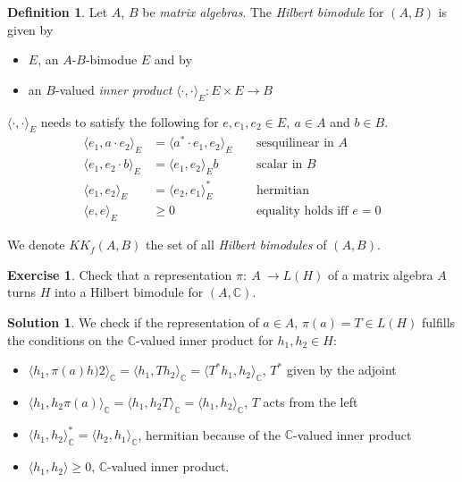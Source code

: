 \documentclass[a4paper]{article}
\theoremstyle{definition}
\newtheorem{definition}{Definition}
\theoremstyle{definition}
\theoremstyle{definition}
\theoremstyle{theorem}
\theoremstyle{theorem}
\newtheorem{exercise}{Exercise}
\theoremstyle{theorem}
\theoremstyle{definition}
\newtheorem{solution}{Solution}
\begin{document}
\begin{definition}
    Let $A$, $B$ be \textit{matrix algebras}. The \textit{Hilbert bimodule} for $(A, B)$ is given by
    \begin{itemize}
        \item $E$, an $A$-$B$-bimodue $E$ and by
        \item an $B$-valued \textit{inner product} $\langle \cdot,\cdot\rangle_E: E\times E \rightarrow B$
    \end{itemize}
$\langle \cdot,\cdot\rangle_E$ needs to satisfy the following for $e, e_1, e_2 \in E,\ a \in A$ and $b \in B$.
\begin{align*}
    \langle e_1, a\cdot e_2\rangle_E &= \langle a^*\cdot e_1, e_2\rangle_E \;\;\;\; & \text{sesquilinear in $A$}\\
    \langle e_1, e_2 \cdot b\rangle_E &= \langle e_1, e_2\rangle_E b \;\;\;\; & \text{scalar in $B$} \\
    \langle e_1, e_2\rangle_E &= \langle e_2,e_1\rangle^*_E \;\;\;\; & \text{hermitian} \\
    \langle e, e\rangle_E &\ge 0 \;\;\;\; & \text{equality holds iff $e=0$}
\end{align*}

\end{definition}

We denote $KK_f(A,B)$ the set of all \textit{Hilbert bimodules} of $(A,B)$.

\begin{exercise}
    Check that a representation $\pi:\ A \ \rightarrow L(H)$ of a matrix algebra $A$ turns $H$ into
    a Hilbert bimodule for $(A, \mathbb{C})$.
\end{exercise}

\begin{solution}
    We check if the representation of $a \in A$, $\pi(a)=T \in L(H)$ fulfills
    the conditions on the $\mathbb{C}$-valued inner product for $h_1, h_2 \in H$:
    \begin{itemize}
        \item $\langle h_1, \pi(a) h)2\rangle _\mathbb{C} = \langle h_1, T h_2\rangle _\mathbb{C} =
            \langle T^* h_1, h_2\rangle _\mathbb{C}$, $T^*$ given by the adjoint
        \item $\langle h_1, h_2 \pi(a)\rangle _\mathbb{C} = \langle h_1, h_2 T\rangle _\mathbb{C} = \langle h_1, h_2\rangle _\mathbb{C}$, $T$ acts from the left
        \item $\langle h_1, h_2\rangle _\mathbb{C}^* = \langle h_2,h_1\rangle _\mathbb{C}$, hermitian because of the
            $\mathbb{C}$-valued inner product
        \item $\langle h_1, h_2\rangle  \ge 0$, $\mathbb{C}$-valued inner product.
    \end{itemize}
\end{solution}
\end{document}

